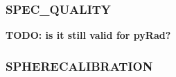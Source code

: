 \documentclass[a4paper,11pt,pdftex,twoside]{scrartcl}
\renewcommand{\bf}{\normalfont \bfseries}
\begin{document}
{{{%
%
%


\subsubsection{SPEC\_QUALITY}
\label{subsec_SPEC_QUALITY}

{\bf TODO: is it still valid for pyRad?}


%
%

\subsubsection{SPHERECALIBRATION}
\label{subsec_SPHERECALIBRATION}

}}}
\end{document}
